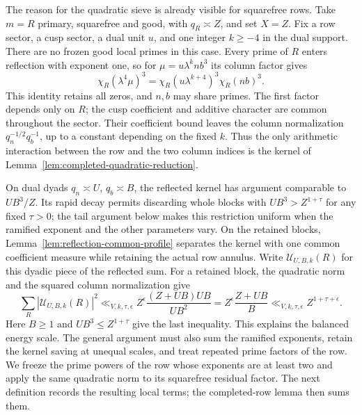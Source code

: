 \documentclass[11pt,a4paper]{article}
\numberwithin{equation}{section}
\numberwithin{figure}{section}
\theoremstyle{definition}
\theoremstyle{remark}
\begin{document}
The reason for the quadratic sieve is already visible for squarefree rows.
Take $m=R$ primary, squarefree and good, with $q_R\asymp Z$, and set $X=Z$.
Fix a row sector, a cusp sector, a dual unit $u$, and one integer $k\ge-4$
in the dual support.  There are no frozen good local primes in this case.
Every prime of $R$ enters reflection with exponent one, so for
$\mu=u\lambda^k n b^3$ its column factor gives
\[
 \chi_R(\lambda^4\mu)^3
 =\chi_R(u\lambda^{k+4})^3\chi_R(nb)^3.
\]
This identity retains all zeros, and $n,b$ may share primes.  The first
factor depends only on $R$; the cusp coefficient and additive character are
common throughout the sector.  Their coefficient bound leaves the column
normalization $q_n^{-1/2}q_b^{-1}$, up to a constant depending on the fixed
$k$.  Thus the only arithmetic interaction between the row and the two
column indices is the kernel of Lemma~\ref{lem:completed-quadratic-reduction}.

On dual dyads $q_n\asymp U$, $q_b\asymp B$, the reflected kernel has argument
comparable to $UB^3/Z$.  Its rapid decay permits discarding whole blocks
with $UB^3>Z^{1+\tau}$ for any fixed $\tau>0$; the tail argument below makes
this restriction uniform when the ramified exponent and the other parameters
vary.  On the retained blocks, Lemma~\ref{lem:reflection-common-profile}
separates the kernel with one common coefficient measure while retaining
the actual row annulus.  Write
$\mathcal U_{U,B,k}(R)$ for this dyadic piece of the reflected sum.  For a
retained block, the quadratic norm and the squared column normalization give
\[
 \sum_R|\mathcal U_{U,B,k}(R)|^2
 \ll_{V,k,\tau,\epsilon}Z^\epsilon
       \frac{(Z+UB)UB}{UB^2}
 =Z^\epsilon\frac{Z+UB}{B}
 \ll_{V,k,\tau,\epsilon}Z^{1+\tau+\epsilon}.
\]
Here $B\ge1$ and $UB^3\le Z^{1+\tau}$ give the last inequality.  This explains
the balanced energy scale.  The general argument must also sum the ramified
exponents, retain the kernel saving at unequal scales, and treat repeated
prime factors of the row.  We freeze the prime powers of the row whose exponents are at least two
and apply the same quadratic norm to its squarefree residual factor.  The next definition
records the resulting local terms; the completed-row lemma then sums them.
\end{document}
